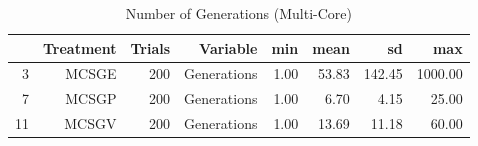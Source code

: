 \begin{table}[ht]
\centering
\begin{tabular}{rrrrrrrr}
  \hline
 & Treatment & Trials & Variable & min & mean & sd & max \\ 
  \hline
3 & MCSGE & 200 & Generations & 1.00 & 53.83 & 142.45 & 1000.00 \\ 
  7 & MCSGP & 200 & Generations & 1.00 & 6.70 & 4.15 & 25.00 \\ 
  11 & MCSGV & 200 & Generations & 1.00 & 13.69 & 11.18 & 60.00 \\ 
   \hline
\end{tabular}
\caption{Number of Generations (Multi-Core)} 
\end{table}
